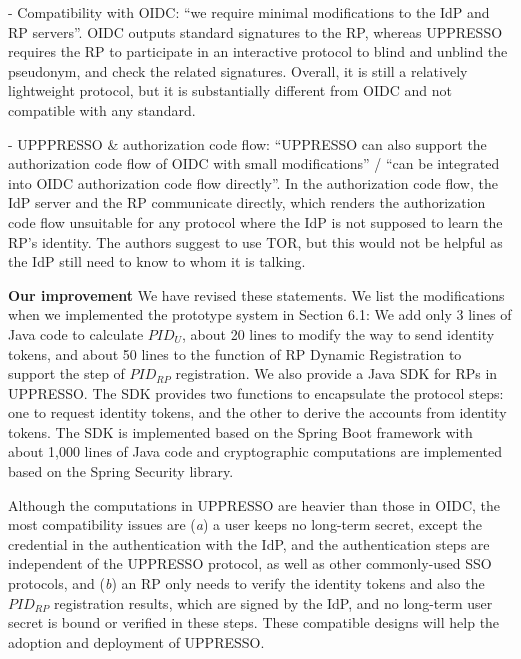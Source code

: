 \documentclass[letterpaper,onecolumn,10pt]{article}
\begin{document}
- Compatibility with OIDC: ``we require minimal modifications to the IdP and RP servers''.
OIDC outputs standard signatures to the RP, whereas UPPRESSO requires the RP to participate in an interactive protocol to blind and unblind the pseudonym, and check the related signatures. Overall, it is still a relatively lightweight protocol, but it is substantially different from OIDC and not compatible with any standard.

- UPPPRESSO \& authorization code flow: ``UPPRESSO can also support the authorization code flow of OIDC with small modifications'' / ``can be integrated into OIDC authorization code flow directly''.
In the authorization code flow, the IdP server and the RP communicate directly, which renders the authorization code flow unsuitable for any protocol where the IdP is not supposed to learn the RP's identity. The authors suggest to use TOR, but this would not be helpful as the IdP still need to know to whom it is talking.


\vspace{1mm}\noindent\textbf{Our improvement}
We have revised these statements. We list the modifications when we implemented the prototype system in Section 6.1:
We add only 3 lines of Java code to calculate $PID_U$, about 20 lines to modify the way to send identity tokens,
 and about 50 lines to the function of RP Dynamic Registration to support the step of $PID_{RP}$ registration.
We also provide a Java SDK for RPs in UPPRESSO.
The SDK provides two functions to encapsulate the protocol steps:
one to request identity tokens, and the other to derive the accounts from identity tokens.
 The SDK is implemented based on the Spring Boot framework with about 1,000 lines of Java code
  and cryptographic computations are implemented based on the Spring Security library.

Although the computations in UPPRESSO are heavier than those in OIDC,
    the most compatibility issues are (\emph{a}) a user keeps no long-term secret, except the credential in the authentication with the IdP,
        and the authentication steps are independent of the UPPRESSO protocol, as well as other commonly-used SSO protocols,
        and (\emph{b}) an RP only needs to verify the identity tokens and also the $PID_{RP}$ registration results, which are signed by the IdP,
                and no long-term user secret is bound or verified in these steps.
These compatible designs will help the adoption and deployment of UPPRESSO.
\end{document}
